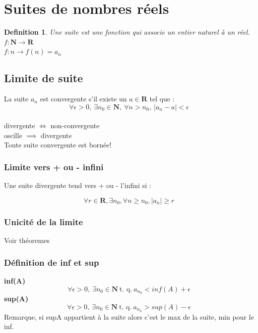 \documentclass{article}
\newtheorem{definition}{Definition}[section]
\begin{document}
\section{Suites de nombres réels}

\begin{definition}
Une suite est une fonction qui associe un entier naturel à un réel. \\
    $ f : \mathbf{N} \rightarrow \mathbf{R} $ \\
    $ f : n \rightarrow f(n) = a_n $
\end{definition}

\subsection{Limite de suite}

La suite $ a_n $ est convergente s'il existe un $ a \in \mathbf{R} $ tel que : \\
\[ \forall \epsilon > 0,\ \exists n_0 \in \mathbf{N},\ \forall n > n_0,\ |a_n - a| < \epsilon \]\\
divergente $ \Leftrightarrow $ non-convergente\\
oscille $ \implies $ divergente \\
Toute suite convergente est bornée!

\subsubsection{Limite vers + ou - infini}

Une suite divergente tend vers + ou - l'infini si :

\[ \forall r \in \mathbf{R}, \exists n_0, \forall n \geq n_0, |a_n|  \geq r \]

\subsubsection{Unicité de la limite}
Voir théoremes

\subsubsection{Définition de inf et sup}

\textbf{inf(A)}\\
\[ \forall \epsilon > 0,\ \exists n_0 \in \mathbf{N}\ \text{t. q.}\ a_{n_0} < inf(A) + \epsilon \]
\textbf{sup(A)}\\
\[ \forall \epsilon > 0,\ \exists n_0 \in \mathbf{N}\ \text{t. q.}\ a_{n_0} > sup(A) - \epsilon \]
Remarque, si supA appartient à la suite alors c'est le max de la suite, min pour le inf.
\end{document}
